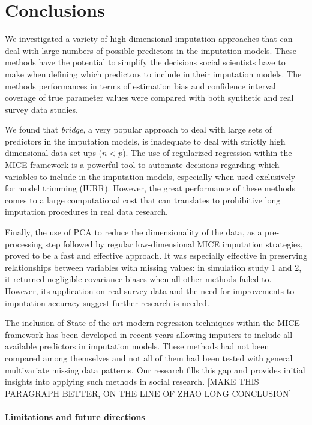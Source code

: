 \section{Conclusions}

	We investigated a variety of high-dimensional imputation approaches that can deal with large numbers 
	of possible predictors in the imputation models.
	These methods have the potential to simplify the decisions social scientists have to make when defining
	which predictors to include in their imputation models.
	The methods performances in terms of estimation bias and confidence interval coverage of true parameter values were 
	compared with both synthetic and real survey data studies.

	We found that \emph{bridge}, a very popular approach to deal with large sets of predictors in the imputation models,
	is inadequate to deal with strictly high dimensional data set ups ($n < p$).
	The use of regularized regression within the MICE framework is a powerful tool to automate decisions regarding which
	variables to include in the imputation models, especially when used exclusively for model trimming (IURR).
	However, the great performance of these methods comes to a large computational cost that can translates to 
	prohibitive long imputation procedures in real data research.

	Finally, the use of PCA to reduce the dimensionality of the data, as a pre-processing step followed by regular 
	low-dimensional MICE imputation strategies, proved to be a fast and effective approach.
	It was especially effective in preserving relationships between variables with missing values:
	in simulation study 1 and 2, it returned negligible covariance biases when all other methods failed to.
	However, its application on real survey data and the need for improvements to imputation accuracy suggest 
	further research is needed.

	The inclusion of State-of-the-art modern regression techniques within the MICE framework has been developed 
	in recent years allowing imputers to include all available predictors in imputation models.
	These methods had not been compared among themselves and not all of them had been tested with general multivariate 
	missing data patterns.
	Our research fills this gap and provides initial insights into applying such methods in social research.
	[MAKE THIS PARAGRAPH BETTER, ON THE LINE OF ZHAO LONG CONCLUSION]

\paragraph{Limitations and future directions}

